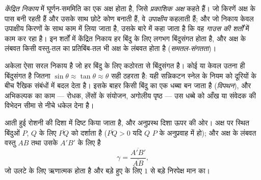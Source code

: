 \begin{definition}[केंद्रित निकाय; गाउस की शर्तें]\label{def:b1:mirrors-thin-lenses:gauss}
\emph{केंद्रित निकाय} में घूर्णन-सममिति का एक अक्ष होता है, जिसे
\emph{प्रकाशिक अक्ष} कहते हैं। जो किरणें अक्ष के पास बनी रहती हैं और उसके साथ
छोटे कोण बनाती हैं, वे \emph{उपाक्षीय} कहलाती हैं; और जो निकाय केवल उपाक्षीय
किरणों के साथ काम में लिया जाता है, उसके बारे में कहा जाता है कि वह
\emph{गाउस की शर्तों} में काम कर रहा है। इन शर्तों में केंद्रित निकाय हर बिंदु
के लिए लगभग बिंदुसंगत होता है, और अक्ष के लंबवत किसी वस्तु-तल का प्रतिबिंब-तल
भी अक्ष के लंबवत होता है (\emph{समतल-संगतता})।
\end{definition}
\admitted

\begin{remark}[छोटे कोण ही क्यों]\label{rem:b1:mirrors-thin-lenses:why}
 अकेला ऐसा सरल निकाय है जो हर बिंदु के लिए कठोरता से बिंदुसंगत है।
कोई  या  केवल उतना ही बिंदुसंगत है जितना
$\sin\theta \approx \tan\theta \approx \theta$ सही ठहरता है: यही सन्निकटन
स्नेल के नियम को दूरियों के बीच रैखिक संबंधों में बदल देता है। इसके बाहर किसी
बिंदु का  एक धब्बा बन जाता है (\emph{विपथन}), और अभिकल्पक का काम ---
रोधक, लेंसों के संयोजन, अगोलीय पृष्ठ --- उस धब्बे को आँख या संवेदक की विभेदन
सीमा से नीचे धकेल देना है।
\end{remark}

\begin{notation}[बीजीय माप और आवर्धन]\label{not:b1:mirrors-thin-lenses:signs}
 आती हुई रोशनी की दिशा में दिष्ट किया जाता है, और अनुप्रस्थ दिशा
ऊपर की ओर। अक्ष पर स्थित बिंदुओं $P$, $Q$ के लिए $\overline{PQ}$  को
दर्शाता है ($\overline{PQ} > 0$ यदि $Q$ $P$ के अनुप्रवाह में हो); और अक्ष के
लंबवत वस्तु $AB$ तथा उसके  $A'B'$ के लिए \emph{} है
\[
\gamma = \frac{\overline{A'B'}}{\overline{AB}} ,
\]
जो उलटे  के लिए ऋणात्मक होता है और बड़े हुए  के लिए $1$ से
बड़े निरपेक्ष मान का।
\end{notation}

